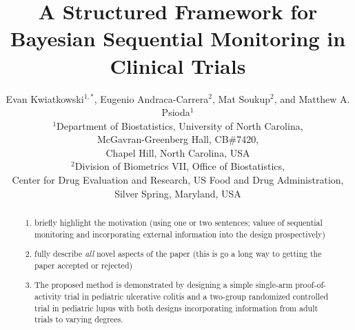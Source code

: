 \documentclass[useAMS,usenatbib,referee]{biom}
\title{A Structured Framework for Bayesian Sequential Monitoring in Clinical Trials}
\author{Evan Kwiatkowski$^{1,*}$\email{ekwiatkowski@unc.edu}, 
Eugenio Andraca-Carrera$^{2}$, Mat Soukup$^{2}$, and Matthew A. Psioda$^{1}$ \\
$^{1}$Department of Biostatistics, University of North Carolina, \\
McGavran-Greenberg Hall, CB\#7420, \\
Chapel Hill, North Carolina, USA\\
$^{2}$Division of Biometrics VII, Office of Biostatistics, \\
Center for Drug Evaluation and Research, US Food and Drug Administration, \\
Silver Spring, Maryland, USA}
\begin{document}


\date{}



\pagerange{\pageref{firstpage}--\pageref{lastpage}} 

\volume{}
\pubyear{}
\artmonth{}


\doi{}


\label{firstpage}


\begin{abstract}
\begin{enumerate}
\item briefly highlight the motivation (using one or two sentences; valuee of sequential monitoring and incorporating external information into the design prospectively)
\item fully describe \textit{all} novel aspects of the paper (this is go a long way to getting the paper accepted or rejected)
\item The proposed method is  demonstrated by designing a simple single-arm proof-of-activity trial in pediatric ulcerative colitis and a two-group randomized controlled trial in pediatric lupus with both designs incorporating information from adult trials to varying degrees.
\end{enumerate}
\end{abstract}
\end{document}
